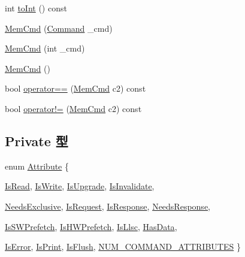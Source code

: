 \begin{DoxyCompactItemize}
int \hyperlink{classMemCmd_af7a5586bcba0f228f5acb3b37ebae263}{toInt} () const 
\item 
\hyperlink{classMemCmd_adca27b55889ccef624966f301e91939d}{MemCmd} (\hyperlink{classMemCmd_a2afce0a47a93eee73a314d53e4890153}{Command} \_\-cmd)
\item 
\hyperlink{classMemCmd_aada95a87c42e8678ad2d33ddee49371d}{MemCmd} (int \_\-cmd)
\item 
\hyperlink{classMemCmd_a2012f22fb5b2ed31685bcb07d3025045}{MemCmd} ()
\item 
bool \hyperlink{classMemCmd_a4e98d44fa893425dc7c1501dd11c8fb9}{operator==} (\hyperlink{classMemCmd}{MemCmd} c2) const 
\item 
bool \hyperlink{classMemCmd_a2ab512e05fc51ffc4735ba5e3116aa1d}{operator!=} (\hyperlink{classMemCmd}{MemCmd} c2) const 
\end{DoxyCompactItemize}
\subsection*{Private 型}
\begin{DoxyCompactItemize}
\item 
enum \hyperlink{classMemCmd_a15b1b83081915ae5239f81050ae0f550}{Attribute} \{ \par
\hyperlink{classMemCmd_a15b1b83081915ae5239f81050ae0f550a5c083a0b513cca57976212fa1a4d6bb1}{IsRead}, 
\hyperlink{classMemCmd_a15b1b83081915ae5239f81050ae0f550a000a93637dc715367664b2c7786cb51c}{IsWrite}, 
\hyperlink{classMemCmd_a15b1b83081915ae5239f81050ae0f550a5796860c87e0cb27832dd195cd00e997}{IsUpgrade}, 
\hyperlink{classMemCmd_a15b1b83081915ae5239f81050ae0f550a407b5114500c316b270d7b67017fa7f3}{IsInvalidate}, 
\par
\hyperlink{classMemCmd_a15b1b83081915ae5239f81050ae0f550a5f936987e076e52ed3ba4d543bad6d8e}{NeedsExclusive}, 
\hyperlink{classMemCmd_a15b1b83081915ae5239f81050ae0f550ac6adcdc7761d2cb9d40a576b7c481228}{IsRequest}, 
\hyperlink{classMemCmd_a15b1b83081915ae5239f81050ae0f550a1d093a8ecc40bc94191ef6a3c080ecdb}{IsResponse}, 
\hyperlink{classMemCmd_a15b1b83081915ae5239f81050ae0f550acb263b087d1077db337a1c833ade51fb}{NeedsResponse}, 
\par
\hyperlink{classMemCmd_a15b1b83081915ae5239f81050ae0f550a57631bcf95706c50f65c1cbcf05e12ef}{IsSWPrefetch}, 
\hyperlink{classMemCmd_a15b1b83081915ae5239f81050ae0f550ac26893611f0b8fd4412787a66ef6dae2}{IsHWPrefetch}, 
\hyperlink{classMemCmd_a15b1b83081915ae5239f81050ae0f550a268ffe4dcb1a1da3af7d4f974eb43bb3}{IsLlsc}, 
\hyperlink{classMemCmd_a15b1b83081915ae5239f81050ae0f550a6c6101ba1ae52efba8f0aa3f8f804bc3}{HasData}, 
\par
\hyperlink{classMemCmd_a15b1b83081915ae5239f81050ae0f550a932a9e9614446674f38a4d2544b496a6}{IsError}, 
\hyperlink{classMemCmd_a15b1b83081915ae5239f81050ae0f550aeea6b1fbe81e58d9d3e09320d9a975bf}{IsPrint}, 
\hyperlink{classMemCmd_a15b1b83081915ae5239f81050ae0f550a88e90f7a52fa39c4ae927bace094d6ab}{IsFlush}, 
\hyperlink{classMemCmd_a15b1b83081915ae5239f81050ae0f550a52d269fc7bf039ec4014a7db13c84756}{NUM\_\-COMMAND\_\-ATTRIBUTES}
 \}
\end{DoxyCompactItemize}
